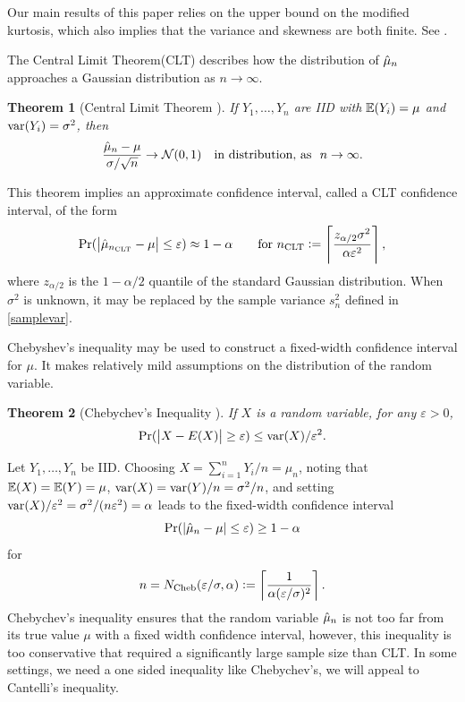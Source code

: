 \documentclass{iitthesis}
\newtheorem{theorem}{Theorem}[section]
\begin{document}
Our main results of this paper relies on the upper bound on the modified kurtosis, which also implies that the variance and skewness are both finite. See \cite{HJLO12}.

The Central Limit Theorem(CLT) describes how the distribution of $\hat{\mu}_n$ approaches a Gaussian distribution as $n \to \infty$.
\begin{theorem}[Central Limit Theorem {\cite[Theorem 21.1]{JP04}}] \label{clt} 
If $Y_1, \ldots, Y_n$ are IID with $\mathbb{E}(Y_i)=\mu$ and $\operatorname{var}(Y_i) = \sigma^2$, then
$$
\frac{\hmu_n-\mu}{\sigma/\sqrt{n}} \to \dnorm(0,1) \quad \text{in distribution, as} \ \ n\to\infty.
$$
\end{theorem}
This theorem implies an approximate confidence interval, called a CLT confidence interval, of the form
\[
\Pr(\left \lvert \hat{\mu}_{n_{\text{CLT}}}-\mu \right \rvert \le \varepsilon) \approx 1- \alpha \qquad \text{for } n_{\text{CLT}} := \left \lceil \frac{z_{\alpha/2}\sigma^2}{\alpha \varepsilon^2} \right \rceil,
\]
where $z_{\alpha/2}$ is the $1-\alpha/2$ quantile of the standard Gaussian distribution.  When $\sigma^2$ is unknown, it may be replaced by the sample variance $s_n^2$ defined in \eqref{samplevar}.

Chebyshev's inequality may be used to construct a fixed-width confidence interval for $\mu$.  It makes relatively mild assumptions on the distribution of the random variable.

\begin{theorem}[Chebychev's Inequality {\cite[6.1.c]{LB10}}] \label{ChebyThm}If $X$ is a random variable, for any $\varepsilon>0$, 
$$\Pr(\left \lvert X-E(X) \right \rvert \ge \varepsilon) \le  \operatorname{var}(X)/\varepsilon^2.$$
\end{theorem}
Let $Y_1, \ldots, Y_n$ be IID. Choosing $X=\sum_{i=1}^n Y_i/n = \mu_n$, noting that $\mathbb{E}(X) = \mathbb{E}(Y) = \mu$, $\operatorname{var}(X) = \operatorname{var}(Y)/n = \sigma^2/n$, and setting $\operatorname{var}(X)/\varepsilon^2=\sigma^2/(n\varepsilon^2) = \alpha$ leads to the fixed-width confidence interval 
\[
\Pr(\left \lvert \hat{\mu}_{n}-\mu \right \rvert \le \varepsilon) \ge 1- \alpha 
\]
 for 
 \begin{align}
n=N_{\text{Cheb}}(\varepsilon/\sigma,\alpha):= \left \lceil \frac{1}{\alpha (\varepsilon/\sigma)^2} \right \rceil.
 \end{align}
 Chebychev's inequality ensures that the random variable $\hat{\mu}_n$ is not too far from its true value $\mu$ with a fixed width confidence interval, however, this inequality is too conservative that required a significantly large sample size than CLT. In some settings, we need a one sided inequality like Chebychev's, we will appeal to Cantelli's inequality.
 
\end{document}
